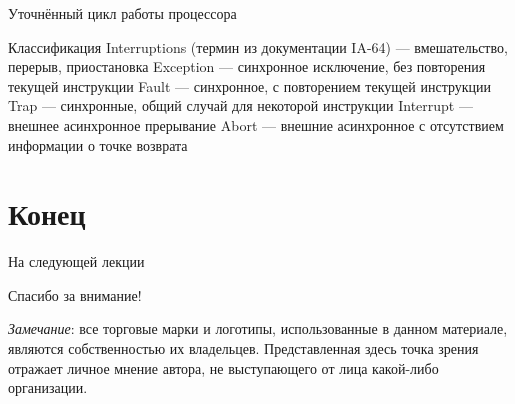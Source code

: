 \documentclass{beamer}
\begin{document}
\begin{frame}[shrink=0.6]{Уточнённый цикл работы процессора}
\centering



\end{frame}

\begin{frame}{Классификация}
Interruptions (термин из документации IA-64) — вмешательство, перерыв, приостановка
Exception — синхронное исключение, без повторения текущей инструкции
Fault — синхронное, с повторением текущей инструкции
Trap — синхронные, общий случай для некоторой инструкции
Interrupt — внешнее асинхронное прерывание
Abort — внешние асинхронное с отсутствием информации о точке возврата
\end{frame}


\section*{Конец}


\begin{frame}{На следующей лекции}
\end{frame}


\begin{frame}

{\huge{Спасибо за внимание!}\par}

\vfill

\tiny{\textit{Замечание}: все торговые марки и логотипы, использованные в данном материале, являются собственностью их владельцев. Представленная здесь точка зрения отражает личное мнение автора, не выступающего от лица какой-либо организации.}

\end{frame}
\end{document}
